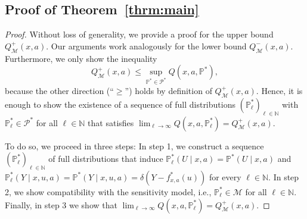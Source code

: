 \documentclass{article} %
\newcommand{\N}{\mathbb{N}}
\theoremstyle{definition}
\theoremstyle{plain}
\begin{document}
\subsection{Proof of Theorem~\ref{thrm:main}}

\begin{proof}
Without loss of generality, we provide a proof for the upper bound $Q^+_\mathcal{M}(x, a)$. Our arguments work analogously for the lower bound $Q^-_\mathcal{M}(x, a)$. Furthermore, we only show the inequality 
\begin{equation}
    Q^+_\mathcal{M}(x, a) \leq \sup_{\mathbb{P}^\ast \in \mathcal{P}^\ast} Q(x, a, \mathbb{P}^\ast),
\end{equation}
because the other direction (``$\geq$'') holds by definition of $Q^+_\mathcal{M}(x, a)$. Hence, it is enough to show the existence of a sequence of full distributions $(\mathbb{P}_\ell^\ast)_{\ell \in \N}$ with $\mathbb{P}_\ell^\ast \in \mathcal{P}^\ast$ for all $\ell \in \N$ that satisfies $\lim_{{\ell \to \infty}} Q(x, a, \mathbb{P}_\ell^\ast) = Q^+_\mathcal{M}(x, a)$.

To do so, we proceed in three steps: In step 1, we construct a sequence $(\mathbb{P}_\ell^\ast)_{\ell \in \N}$ of full distributions that induce $\mathbb{P}_\ell^\ast(U \mid x, a) = \mathbb{P}^\ast(U \mid x, a)$ and $\mathbb{P}_\ell^\ast(Y \mid x, u, a) = \mathbb{P}^\ast(Y \mid x, u, a) = \delta(Y - f^\ast_{x, a}(u))$ for every $\ell \in \N$. In step 2, we show compatibility with the sensitivity model, i.e., $\mathbb{P}_\ell^\ast \in \mathcal{M}$ for all $\ell \in \N$. Finally, in step 3 we show that $\lim_{{\ell \to \infty}} Q(x, a, \mathbb{P}_\ell^\ast) = Q^+_\mathcal{M}(x, a)$.


\end{proof}
\end{document}
